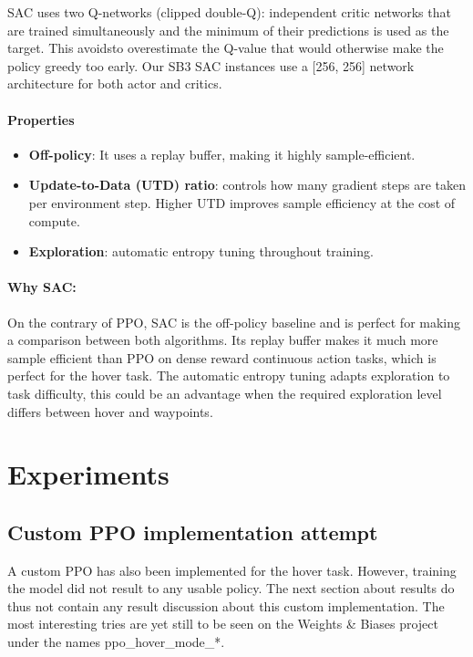 \documentclass[11pt,a4paper]{article}
\begin{document}
SAC uses two Q-networks (clipped double-Q): independent critic networks that are trained
simultaneously and the minimum of their predictions is used as the target.
This avoidsto overestimate the  Q-value that would otherwise make the policy greedy
too early.
Our SB3 SAC instances use a [256, 256] network architecture for both actor and critics.

\paragraph{Properties}

\begin{itemize}
  \item \textbf{Off-policy}: It uses a replay buffer, making it highly sample-efficient.
  \item \textbf{Update-to-Data (UTD) ratio}: controls how many gradient steps are taken per
    environment step.  Higher UTD improves sample efficiency at the cost of compute.
  \item \textbf{Exploration}: automatic entropy tuning throughout training.
\end{itemize}

\paragraph{Why SAC:}

On the contrary of PPO, SAC is the off-policy baseline and is perfect for making a comparison between both algorithms. Its replay buffer makes it much more sample efficient than PPO on dense reward continuous action tasks, which is perfect for the hover task. The automatic entropy tuning adapts exploration to task difficulty, this could be an advantage when the required exploration level differs between hover and waypoints.

\section{Experiments}

\subsection{Custom PPO implementation attempt}

A custom PPO has also been implemented for the hover task. However, training the model did not result to any usable policy. The next section about results do thus not contain any result discussion about this custom implementation. The most interesting tries are yet still to be seen on the Weights \& Biases project under the names ppo\_hover\_mode\_*.
\end{document}
